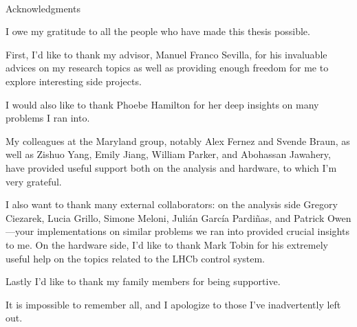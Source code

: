 \hbox{\ }
\vspace{.5in}
\renewcommand{\baselinestretch}{2}

\begin{center}
\large{Acknowledgments}
\end{center}

\vspace{1ex}

I owe my gratitude to all the people who have made this thesis possible.

First, I'd like to thank my advisor, Manuel Franco Sevilla,
for his invaluable advices on my research topics as well as providing enough
freedom for me to explore interesting side projects.

I would also like to thank Phoebe Hamilton for her deep insights on many
problems I ran into.

My colleagues at the Maryland group, notably Alex Fernez and Svende Braun,
as well as Zishuo Yang, Emily Jiang, William Parker, and Abohassan Jawahery,
have provided useful support both on the analysis and hardware,
to which I'm very grateful.

I also want to thank many external collaborators:
on the analysis side Gregory Ciezarek, Lucia Grillo, Simone Meloni,
Julián García Pardiñas, and Patrick Owen---your implementations on similar
problems we ran into provided crucial insights to me.
On the hardware side, I'd like to thank Mark Tobin for his extremely useful
help on the topics related to the LHCb control system.

Lastly I'd like to thank my family members for being supportive.

It is impossible to remember all, and I apologize to those I've inadvertently
left out.
